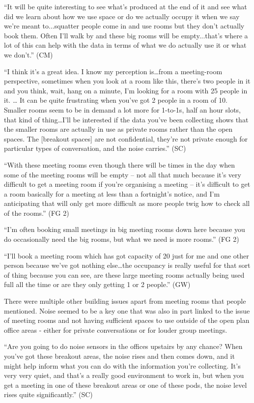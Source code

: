 “It will be quite interesting to see what’s produced at the end of it
and see what did we learn about how we use space or do we actually
occupy it when we say we’re meant to...squatter people come in and use
rooms but they don’t actually book them. Often I’ll walk by and these
big rooms will be empty...that’s where a lot of this can help with the
data in terms of what we do actually use it or what we don’t.” (CM)

“I think it’s a great idea. I know my perception is…from a
meeting-room perspective, sometimes when you look at a room like this,
there’s two people in it and you think, wait, hang on a minute, I’m
looking for a room with 25 people in it. … It can be quite frustrating
when you’ve got 2 people in a room of 10. Smaller rooms seem to be in
demand a lot more for 1-to-1s, half an hour slots, that kind of
thing…I’ll be interested if the data you’ve been collecting shows that
the smaller rooms are actually in use as private rooms rather than the
open spaces. The [breakout spaces] are not confidential, they’re not
private enough for particular types of conversation, and the noise
carries.” (SC)

“With these meeting rooms even though there will be times in the day
when some of the meeting rooms will be empty – not all that much
because it’s very difficult to get a meeting room if you’re organising
a meeting – it’s difficult to get a room basically for a meeting at
less than a fortnight’s notice, and I’m anticipating that will only
get more difficult as more people twig how to check all of the rooms.”
(FG 2)

 
“I’m often booking small meetings in big meeting rooms down here
because you do occasionally need the big rooms, but what we need is
more rooms.” (FG 2)

“I’ll book a meeting room which has got capacity of 20 just for me and
one other person because we’ve got nothing else…the occupancy is
really useful for that sort of thing because you can see, are these
large meeting rooms actually being used full all the time or are they
only getting 1 or 2 people.” (GW)

There were multiple other building issues apart from meeting rooms
that people mentioned. Noise seemed to be a key one that was also in
part linked to the issue of meeting rooms and not having sufficient
spaces to use outside of the open plan office areas - either for
private conversations or for louder group meetings.

“Are you going to do noise sensors in the offices upstairs by any
chance? When you’ve got these breakout areas, the noise rises and then
comes down, and it might help inform what you can do with the
information you’re collecting. It’s very very quiet, and that’s a
really good environment to work in, but when you get a meeting in one
of these breakout areas or one of these pods, the noise level rises
quite significantly.” (SC)

